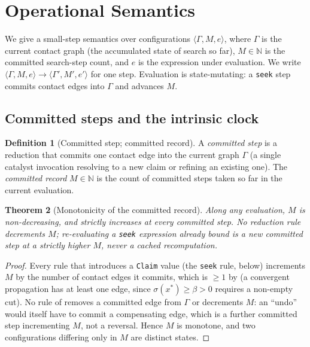 \documentclass[11pt,twocolumn,a4paper]{article}
\theoremstyle{thmstyle}
\newtheorem{theorem}{Theorem}[section]
\theoremstyle{definition}
\newtheorem{definition}[theorem]{Definition}
\theoremstyle{remark}
\newcommand{\N}{\mathbb{N}}
\newcommand{\Gph}{\Gamma}
\newcommand{\flo}{\beta}
\newcommand{\rec}{M}
\newcommand{\str}{\sigma}
\newcommand{\stepto}{\longrightarrow}
\begin{document}
\section{Operational Semantics}
\label{sec:semantics}

We give a small-step semantics over configurations
$\langle\Gph,\rec,e\rangle$, where $\Gph$ is the current contact graph
(the accumulated state of search so far), $\rec\in\N$ is the committed
search-step count, and $e$ is the expression under evaluation. We write
$\langle\Gph,\rec,e\rangle\stepto\langle\Gph',\rec',e'\rangle$ for one
step. Evaluation is state-mutating: a \texttt{seek} step commits contact
edges into $\Gph$ and advances $\rec$.

\subsection{Committed steps and the intrinsic clock}

\begin{definition}[Committed step; committed record]
\label{def:committed}
A \emph{committed step} is a reduction that commits one contact edge into
the current graph $\Gph$ (a single catalyst invocation resolving to a new
claim or refining an existing one). The \emph{committed record}
$\rec\in\N$ is the count of committed steps taken so far in the current
evaluation.
\end{definition}

\begin{theorem}[Monotonicity of the committed record]
\label{thm:monotone-count}
Along any evaluation, $\rec$ is non-decreasing, and strictly increases at
every committed step. No reduction rule decrements $\rec$; re-evaluating a
\texttt{seek} expression already bound is a new committed step at a
strictly higher $\rec$, never a cached recomputation.
\end{theorem}

\begin{proof}
Every rule that introduces a \texttt{Claim} value (the \texttt{seek}
rule,  below) increments $\rec$ by the number of
contact edges it commits, which is $\ge1$ by  (a
convergent propagation has at least one edge, since $\str(x^\ast)\ge\flo>0$
requires a non-empty cut). No rule of  removes a
committed edge from $\Gph$ or decrements $\rec$: an ``undo'' would itself
have to commit a compensating edge, which is a further committed step
incrementing $\rec$, not a reversal. Hence $\rec$ is monotone, and two
configurations differing only in $\rec$ are distinct states.
\end{proof}
\end{document}
